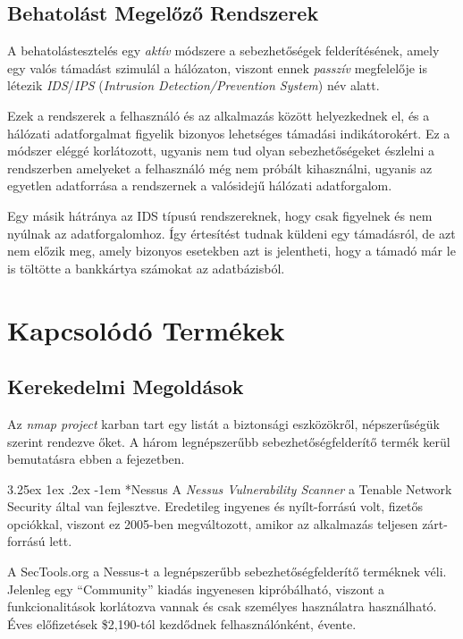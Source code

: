 \documentclass[a4paper,12pt]{article}
\makeatletter
\renewcommand\paragraph{\@startsection{paragraph}{6}{\parindent}%
  {3.25ex \@plus1ex \@minus .2ex}%
  {-1em}%
  {\normalfont\normalsize\bfseries}}
\makeatother
\begin{document}
\subsection{Behatolást Megelőző Rendszerek}
	
	A behatolástesztelés egy \textit{aktív} módszere a sebezhetőségek felderítésének, amely egy valós támadást szimulál a hálózaton, viszont ennek \textit{passzív} megfelelője is létezik \textit{IDS}/\textit{IPS} (\textit{Intrusion Detection/Prevention System}) név alatt.
	
	Ezek a rendszerek a felhasználó és az alkalmazás között helyezkednek el, és a hálózati adatforgalmat figyelik bizonyos lehetséges támadási indikátorokért. Ez a módszer eléggé korlátozott, ugyanis nem tud olyan sebezhetőségeket észlelni a rendszerben amelyeket a felhasználó még nem próbált kihasználni, ugyanis az egyetlen adatforrása a rendszernek a valósidejű hálózati adatforgalom.
	
	Egy másik hátránya az IDS típusú rendszereknek, hogy csak figyelnek és nem nyúlnak az adatforgalomhoz. Így értesítést tudnak küldeni egy támadásról, de azt nem előzik meg, amely bizonyos esetekben azt is jelentheti, hogy a támadó már le is töltötte a bankkártya számokat az adatbázisból.

\section{Kapcsolódó Termékek} \label{relwork}
	
\subsection{Kerekedelmi Megoldások} \label{ssec:comtools}
	
	Az \textit{nmap project} karban tart egy listát a biztonsági eszközökről, népszerűségük szerint rendezve őket\cite{sectools}. A három legnépszerűbb sebezhetőségfelderítő termék kerül bemutatásra ebben a fejezetben.
	
	\paragraph*{Nessus} A \textit{Nessus Vulnerability Scanner}\cite{nessus} a Tenable Network Security által van fejlesztve. Eredetileg ingyenes és nyílt-forrású volt, fizetős opciókkal, viszont ez 2005-ben megváltozott, amikor az alkalmazás teljesen zárt-forrású lett.
	
	A SecTools.org a Nessus-t a legnépszerűbb sebezhetőségfelderítő terméknek véli. Jelenleg egy ``Community'' kiadás ingyenesen kipróbálható, viszont a funkcionalitások korlátozva vannak és csak személyes használatra használható. Éves előfizetések \$2,190-tól kezdődnek felhasználónként, évente.
	
\end{document}
